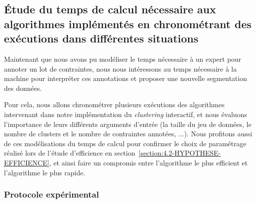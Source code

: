 	\subsection{Étude du temps de calcul nécessaire aux algorithmes implémentés en chronométrant des exécutions dans différentes situations}
	\label{section:4.3.2-ETUDE-COUTS-TEMPS-CALCUL}
		
		Maintenant que nous avons pu modéliser le temps nécessaire à un expert pour annoter un lot de contraintes, nous nous intéressons au temps nécessaire à la machine pour interpréter ces annotations et proposer une nouvelle segmentation des données.
		
		Pour cela, nous allons chronométrer plusieurs exécutions des algorithmes intervenant dans notre implémentation du \textit{clustering} interactif, et nous évaluons l'importance de leurs différents arguments d'entrée (la taille du jeu de données, le nombre de clusters et le nombre de contraintes annotées, ...).
		Nous profitons aussi de ces modélisations du temps de calcul pour confirmer le choix de paramétrage réalisé lors de l'étude d'efficience en section~\ref{section:4.2-HYPOTHESE-EFFICIENCE}, et ainsi faire un compromis entre l'algorithme le plus efficient et l'algorithme le plus rapide.
	
		\subsubsection{Protocole expérimental}
			
